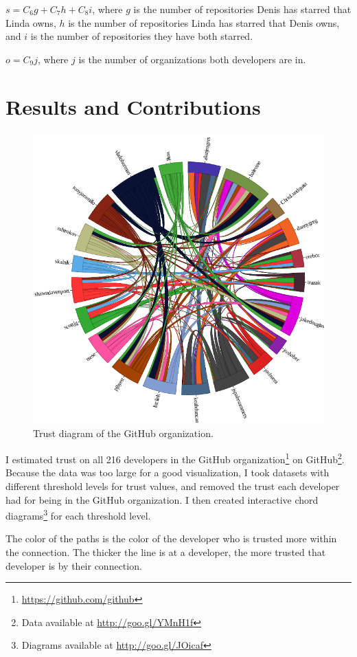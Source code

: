 \documentclass{acm_proc_article-sp}
\begin{document}
  $ s = C_6g + C_7h + C_8i$, where $g$ is the number of repositories Denis has starred that Linda owns, $h$ is the number of repositories Linda has starred that Denis owns, and $i$ is the number of repositories they have both starred.

  $ o = C_9j $, where $j$ is the number of organizations both developers are in.

\section{Results and Contributions}
  \begin{figure}
    \centering
    \includegraphics[width=.85\columnwidth, height=.85\columnwidth]{chord-diagram.pdf}
    \caption{Trust diagram of the GitHub organization. }
    \label{fig:trust}
  \end{figure}

  I estimated trust on all 216 developers in the GitHub organization\footnote{\url{https://github.com/github}} on GitHub\footnote{Data available at \url{http://goo.gl/YMnH1f}}. Because the data was too large for a good visualization, I took datasets with different threshold levels for trust values, and removed the trust each developer had for being in the GitHub organization. I then created interactive chord diagrams\footnote{Diagrams available at \url{http://goo.gl/JOicaf}} for each threshold level.

  The color of the paths is the color of the developer who is trusted more within the connection. The thicker the line is at a developer, the more trusted that developer is by their connection.
\end{document}

